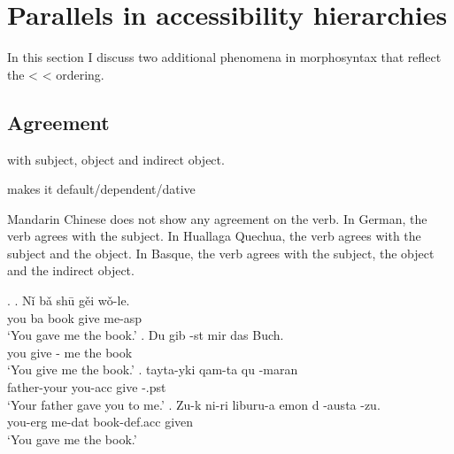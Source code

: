 \section{Parallels in accessibility hierarchies}

In this section I discuss two additional phenomena in morphosyntax that reflect the  <  <  ordering.

\subsection{Agreement}

\citealt{moravcsik1978,gilligan1987} with subject, object and indirect object.


\citealt{bobaljik2006} makes it default/dependent/dative

Mandarin Chinese does not show any agreement on the verb. In German, the verb agrees with the subject. In Huallaga Quechua, the verb agrees with the subject and the object. In Basque, the verb agrees with the subject, the object and the indirect object.


\ex.
\ag. Nǐ bǎ shū gěi wǒ-le.\\
 you ba book give me-\ac{asp}\\
 `You gave me the book.' 
\bg. Du gib -st mir das Buch.\\
 you give - me the book\\
 `You give me the book.' 
\bg. tayta-yki qam-ta qu -maran\\
 father-your you-\ac{acc} give -.\ac{pst}\\
 `Your father gave you to me.' 
\bg. Zu-k ni-ri liburu-a emon d -austa -zu.\\
 you-\ac{erg} me-\ac{dat} book-\ac{def}.\ac{acc} given   \\
 `You gave me the book.' 


